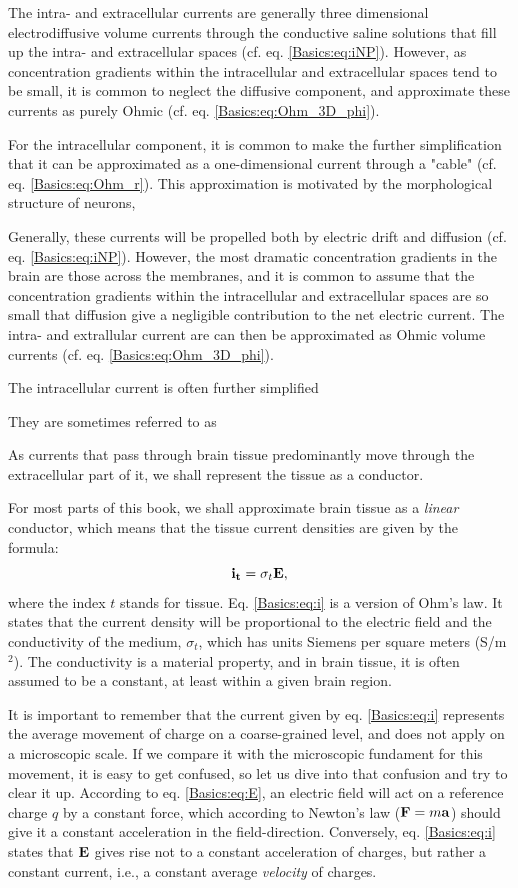 The intra- and extracellular currents are generally three dimensional electrodiffusive volume currents through the conductive saline solutions that fill up the intra- and extracellular spaces (cf. eq. \ref{Basics:eq:iNP}). However, as concentration gradients within the intracellular and extracellular spaces tend to be small, it is common to neglect the diffusive component, and approximate these currents as purely Ohmic (cf. eq. \ref{Basics:eq:Ohm_3D_phi}). 


For the intracellular component, it is common to make the further simplification that it can be approximated as a one-dimensional current through a "cable" (cf. eq. \ref{Basics:eq:Ohm_r}). This approximation is motivated by the morphological structure of neurons, 


Generally, these currents will be propelled both by electric drift and diffusion (cf. eq. \ref{Basics:eq:iNP}). However, the most dramatic concentration gradients in the brain are those across the membranes, and it is common to assume that the concentration gradients within the intracellular and extracellular spaces are so small that diffusion give a negligible contribution to the net electric current. The intra- and extrallular current are can then be approximated as Ohmic volume currents (cf. eq. \ref{Basics:eq:Ohm_3D_phi}). 

The intracellular current is often further simplified 


They are sometimes referred to as


As currents that pass through brain tissue predominantly move through the extracellular part of it, we shall represent the tissue as a conductor. 

For most parts of this book, we shall approximate brain tissue as a \textit{linear} conductor, which means that the tissue current densities are given by the formula:
\begin{equation}
{\bf i_t} = \sigma_t {\bf E},
\label{Basics:eq:i}
\end{equation}
where the index $t$ stands for tissue. Eq. \ref{Basics:eq:i} is a version of Ohm's law. It states that the current density will be proportional to the electric field and the conductivity of the medium, $\sigma_t$, which has units Siemens per square meters (S/m$^2$). The conductivity is a material property, and in brain tissue, it is often assumed to be a constant, at least within a given brain region. 

It is important to remember that the current given by eq. \ref{Basics:eq:i} represents the average movement of charge on a coarse-grained level, and does not apply on a microscopic scale. If we compare it with the microscopic fundament for this movement, it is easy to get confused, so let us dive into that confusion and try to clear it up. According to eq. \ref{Basics:eq:E}, an electric field will act on a reference charge $q$ by a constant force, which according to Newton's law (${\bf F} = m{\bf a}$) should give it a constant acceleration in the field-direction. Conversely, eq. \ref{Basics:eq:i} states that ${\bf E}$ gives rise not to a constant acceleration of charges, but rather a constant current, i.e., a constant average \textit{velocity} of charges. 

